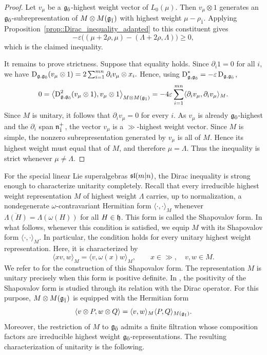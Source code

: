\begin{proof}
 Let $v_{\mu}$ be a ${\mathfrak{g}_{\bar{0}}}$-highest weight vector of
 $L_{0}(\mu)$. Then $v_{\mu}\otimes 1$ generates an
 ${\mathfrak{g}_{\bar{0}}}$-subrepresentation of $M\otimes M({\mathfrak{g}_{\bar{1}}})$ with highest weight
 $\mu-\rho_{\bar1}$. Applying
 Proposition~\ref{prop::Dirac_inequality_adapted} to this constituent
 gives
 \[
 -\varepsilon
 \bigl(
 (\mu+2\rho,\mu)-(\Lambda+2\rho,\Lambda)
 \bigr)
 \geq0,
 \]
 which is the claimed inequality.

 It remains to prove strictness. Suppose that equality holds. Since
 $\partial_i1=0$ for all $i$, we have
 $
 \operatorname{D}_{{\mathfrak{g}},{\mathfrak{g}_{\bar{0}}}}(v_{\mu}\otimes1)
 =
 2\sum_{i=1}^{mn}\partial_i v_{\mu}\otimes x_i.
 $
 Hence, using
 $\operatorname{D}_{{\mathfrak{g}},{\mathfrak{g}_{\bar{0}}}}^{*}=-\varepsilon\operatorname{D}_{{\mathfrak{g}},{\mathfrak{g}_{\bar{0}}}}$,
 \[
 0
 =
 \bigl\langle
 \operatorname{D}_{{\mathfrak{g}},{\mathfrak{g}_{\bar{0}}}}^{2}(v_{\mu}\otimes1),
 v_{\mu}\otimes1
 \bigr\rangle_{M\otimes M({\mathfrak{g}_{\bar{1}}})}
 =
 -4\varepsilon
 \sum_{i=1}^{mn}
 \langle
 \partial_i v_{\mu},
 \partial_i v_{\mu}
 \rangle_M.
 \]
 Since $M$ is unitary, it follows that
 $\partial_i v_{\mu}=0$ for every $i$. As $v_{\mu}$ is already
 ${\mathfrak{g}_{\bar{0}}}$-highest and the $\partial_i$ span
 ${\mathfrak{n}}_{\bar1}^{+}$, the vector $v_{\mu}$ is a
 $\gg$-highest weight vector. Since $M$ is simple, the nonzero
 subrepresentation generated by $v_{\mu}$ is all of $M$. Hence its highest
 weight must equal that of $M$, and therefore $\mu=\Lambda$.
 Thus the inequality is strict whenever $\mu\neq\Lambda$.
\end{proof}



For the special linear Lie superalgebras ${\mathfrak{sl}(m\vert n)}$, the Dirac inequality is strong
enough to characterize unitarity completely. Recall that every irreducible highest weight representation $M$ of highest weight $\Lambda$ carries, up to normalization, a nondegenerate $\omega$-contravariant Hermitian form $\langle\cdot,\cdot\rangle_M$ whenever $\overline{\Lambda(H)}=\Lambda(\omega(H))$ for all $H\in{\mathfrak h}$. This form is called the Shapovalov form. In what follows, whenever this condition is satisfied, we equip $M$ with its Shapovalov form $\langle\cdot,\cdot\rangle_M$. In particular, the condition holds for every unitary highest weight representation. Here, it is characterized by
\begin{equation}
 \langle xv,w\rangle_M
 =
 \langle v,\omega(x)w\rangle_M,
 \qquad
 x\in\gg,\quad v,w\in M.
\end{equation}
We refer to \cite{SchmidtDirac,Schmidt} for the construction of this
Shapovalov form. The representation $M$ is unitary precisely when this
form is positive definite. In \cite{SchmidtDirac,Schmidt}, the positivity of the Shapovalov form is
studied through its relation with the Dirac operator. For this purpose,
$M\otimes M({\mathfrak{g}_{\bar{1}}})$ is equipped with the Hermitian form
\begin{equation}\label{eq::Hermitian_form_M_oscillator}
 \langle v\otimes P,w\otimes Q\rangle
 =
 \langle v,w\rangle_M
 \langle P,Q\rangle_{M({\mathfrak{g}_{\bar{1}}})}.
\end{equation}
Moreover, the restriction of $M$ to ${\mathfrak{g}_{\bar{0}}}$ admits a finite filtration
whose composition factors are irreducible highest weight
${\mathfrak{g}_{\bar{0}}}$-representations. The resulting characterization of unitarity is
the following.

